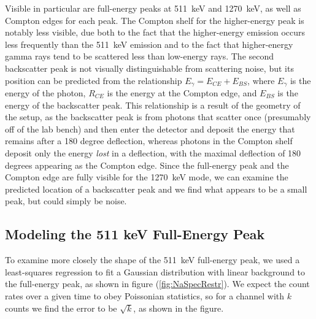 \documentclass[letter]{article}
\begin{document}
 Visible in particular are full-energy peaks at \qty{511}{\kilo\electronvolt} and \qty{1270}{\kilo\electronvolt}, as well as Compton edges for each peak. The Compton shelf for the higher-energy peak is notably less visible, due both to the fact that the higher-energy emission occurs less frequently than the \qty{511}{\kilo\electronvolt} emission and to the fact that higher-energy gamma rays tend to be scattered less than low-energy rays. The second backscatter peak is not visually distinguishable from scattering noise, but its position can be predicted from the relationship $E_\gamma = E_{CE} + E_{BS}$, where $E_\gamma$ is the energy of the photon, $R_{CE}$ is the energy at the Compton edge, and $E_{BS}$ is the energy of the backscatter peak. This relationship is a result of the geometry of the setup, as the backscatter peak is from photons that scatter once (presumably off of the lab bench) and then enter the detector and deposit the energy that remains after a 180 degree deflection, whereas photons in the Compton shelf deposit only the energy \textit{lost} in a deflection, with the maximal deflection of 180 degrees appearing as the Compton edge. Since the full-energy peak and the Compton edge are fully visible for the \qty{1270}{\kilo\electronvolt} mode, we can examine the predicted location of a backscatter peak and we find what appears to be a small peak, but could simply be noise. 

\subsection{Modeling the 511 keV Full-Energy Peak}

To examine more closely the shape of the \qty{511}{\kilo\electronvolt} full-energy peak, we used a least-squares regression to fit a Gaussian distribution with linear background to the full-energy peak, as shown in figure (\ref{fig:NaSpecRestr}). We expect the count rates over a given time to obey Poissonian statistics, so for a channel with $k$ counts we find the error to be $\sqrt{k}$, as shown in the figure.

\end{document}
